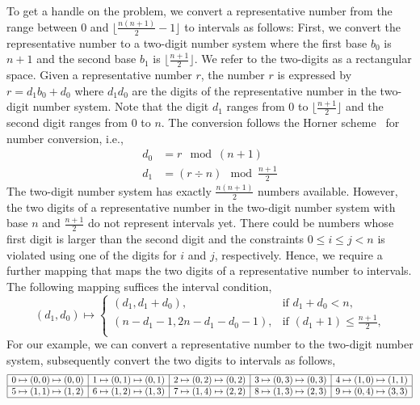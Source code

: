 \documentclass[AMA,LATO1COL]{WileyNJD-v2}
\begin{document}
To get a handle on the problem, we convert a representative number from the range between $0$ and $ \lfloor \frac{n(n+1)}{2}-1 \rfloor$ to intervals as follows: First, we convert the representative number to a two-digit number system where the first base $b_0$ is $n+1$ and the second base $b_1$ is $ \lfloor \frac{n+1}{2} \rfloor$. We refer to the two-digits as a rectangular space. Given a representative number $r $, the number $r$ is expressed by $r = d_1 b_0 + d_0$ where $d_1 d_0$ are the digits of the representative number in the two-digit number system. Note that the digit $d_1$ ranges from $0$ to $ \lfloor \frac{n+1}{2} \rfloor$ and the second digit ranges from $0$ to $n$.  The conversion follows the Horner scheme~\cite{refernce-for-conversion-needed} for number conversion, i.e.,
\begin{align*}
d_0 &= r\mod (n+1) \\
d_1 &= (r \div n) \mod \frac{n+1}{2}
\end{align*}
The two-digit number system has exactly $\frac{n(n+1)}{2}$ numbers available. However, the two digits of a representative number in the two-digit number system with base $n$ and $\frac{n+1}{2}$ do not represent intervals yet. There could be numbers whose first digit is larger than the second digit and the constraints $0 \leq i \leq j < n$ is violated using one of the digits for $i$ and $j$, respectively.  Hence, we require a further mapping that maps the two digits of a representative number to intervals.  The following mapping suffices the interval condition,
\begin{equation*}
(d_1, d_0) \mapsto
\begin{cases}
(d_1, d_1 + d_0), & \mbox{if $d_1 + d_0 < n$,} \\
(n - d_1 - 1, 2 n - d_1 - d_0 -1), & \mbox{if $(d_1 + 1) \leq \frac{n+1}{2}$,} \\
\end{cases}
\end{equation*}
For our example, we can convert a representative number to the two-digit number system, subsequently convert the two digits to intervals as follows,
\begin{equation*}
\begin{array}{|l|l|l|l|l|}
\hline
0 \mapsto (0,0)  \mapsto (0,0) &
1 \mapsto (0,1) \mapsto (0,1)  &
2 \mapsto (0,2)  \mapsto (0,2) &
3 \mapsto (0,3)  \mapsto (0,3) &
4 \mapsto (1,0) \mapsto (1,1) \\
\hline
5 \mapsto (1,1) \mapsto (1,2)&
6 \mapsto (1,2) \mapsto (1, 3)&
7 \mapsto (1,4)  \mapsto (2,2) &
8 \mapsto (1,3) \mapsto (2,3)  &
9 \mapsto (0,4)  \mapsto (3,3) \\
\hline
\end{array}
\end{equation*}
\end{document}
